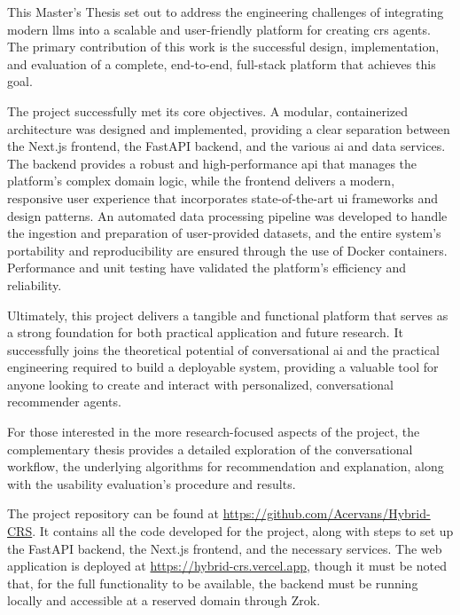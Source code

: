 This Master's Thesis set out to address the engineering challenges of integrating modern \acp{llm} into a scalable and user-friendly platform for creating \acs{crs} agents. The primary contribution of this work is the successful design, implementation, and evaluation of a complete, end-to-end, full-stack platform that achieves this goal.

The project successfully met its core objectives. A modular, containerized architecture was designed and implemented, providing a clear separation between the Next.js frontend, the FastAPI backend, and the various \acs{ai} and data services. The backend provides a robust and high-performance \ac{api} that manages the platform's complex domain logic, while the frontend delivers a modern, responsive user experience that incorporates state-of-the-art \acs{ui} frameworks and design patterns. An automated data processing pipeline was developed to handle the ingestion and preparation of user-provided datasets, and the entire system's portability and reproducibility are ensured through the use of Docker containers. Performance and unit testing have validated the platform's efficiency and reliability.

Ultimately, this project delivers a tangible and functional platform that serves as a strong foundation for both practical application and future research. It successfully joins the theoretical potential of conversational \acs{ai} and the practical engineering required to build a deployable system, providing a valuable tool for anyone looking to create and interact with personalized, conversational recommender agents. 

For those interested in the more research-focused aspects of the project, the complementary thesis \cite{MUI2ICSI-THESIS} provides a detailed exploration of the conversational workflow, the underlying algorithms for recommendation and explanation, along with the usability evaluation's procedure and results.

The project repository can be found at \url{https://github.com/Acervans/Hybrid-CRS}. It contains all the code developed for the project, along with steps to set up the FastAPI backend, the Next.js frontend, and the necessary services. The web application is deployed at \url{https://hybrid-crs.vercel.app}, though it must be noted that, for the full functionality to be available, the backend must be running locally and accessible at a reserved domain through Zrok.